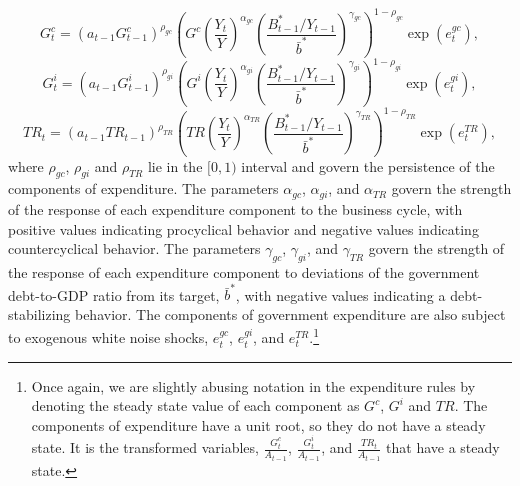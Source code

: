 \documentclass[12pt]{article}
\begin{document}
\begin{equation}
G_t^c = (a_{t-1}G_{t-1}^c)^{\rho_{gc}}\left(G^c \left(\frac{Y_t}{Y} \right)^{\alpha_{gc}} \left(\frac{B^{\ast}_{t-1}/Y_{t-1}}{\bar{b}^*} \right)^{\gamma_{gc}}\right)^{1-\rho_{gc}}\exp(e_t^{gc}), \label{eq:gc}
\end{equation}
\begin{equation}
G_t^i = (a_{t-1}G_{t-1}^i)^{\rho_{gi}}\left(G^i \left(\frac{Y_t}{Y} \right)^{\alpha_{gi}} \left(\frac{B^{\ast}_{t-1}/Y_{t-1}}{\bar{b}^*} \right)^{\gamma_{gi}}\right)^{1-\rho_{gi}}\exp(e_t^{gi}), \label{eq:gi}
\end{equation}
\begin{equation}
TR_t = (a_{t-1}TR_{t-1})^{\rho_{TR}}\left(TR \left(\frac{Y_t}{Y} \right)^{\alpha_{TR}} \left(\frac{B^{\ast}_{t-1}/Y_{t-1}}{\bar{b}^*} \right)^{\gamma_{TR}}\right)^{1-\rho_{TR}}\exp(e_t^{TR}), \label{eq:tr}
\end{equation}
where $\rho_{gc}$, $\rho_{gi}$ and $\rho_{TR}$ lie in the $[0, 1)$ interval and govern the persistence of the components of expenditure. The parameters $\alpha_{gc}$, $\alpha_{gi}$, and $\alpha_{TR}$ govern the strength of the response of each expenditure component to the business cycle, with positive values indicating procyclical behavior and negative values indicating countercyclical behavior. The parameters $\gamma_{gc}$, $\gamma_{gi}$, and $\gamma_{TR}$ govern the strength of the response of each expenditure component to deviations of the government debt-to-GDP ratio from its target, $\bar{b}^*$, with negative values indicating a debt-stabilizing behavior. The components of government expenditure are also subject to exogenous white noise shocks, $e_t^{gc}$, $e_t^{gi}$, and $e_t^{TR}$.\footnote{Once again, we are slightly abusing notation in the expenditure rules by denoting the steady state value of each component as $G^c$, $G^i$ and $TR$. The components of expenditure have a unit root, so they do not have a steady state. It is the transformed variables, $\frac{G_t^c}{A_{t-1}}$, $\frac{G_t^i}{A_{t-1}}$, and $\frac{TR_t}{A_{t-1}}$ that have a steady state.}
\end{document}
